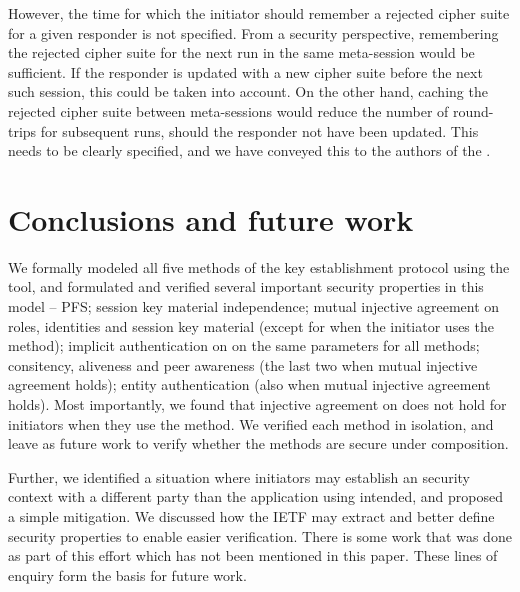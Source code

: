 \documentclass[runningheads, envcountsame, hidelinks, a4paper, x11names]{llncs}
\begin{document}
However, the time for which the initiator should
remember a rejected cipher suite for a given responder is not specified.
%
From a security perspective, remembering the rejected cipher suite for the
next \mEdhoc{} run in the same meta-session would be sufficient.
%
If the responder is updated with a new cipher suite before the next such
session, this could be taken into account. On the other hand, caching the
rejected cipher suite between meta-sessions would reduce the number of
round-trips for subsequent runs, should the responder not have been updated.
%
This needs to be clearly specified, and we have conveyed this to the authors of the \mSpec.

\section{Conclusions and future work}
\label{sec:conclusions}
We formally modeled all five
methods of the \mEdhoc{} key establishment protocol using the \mTamarin{} tool, and
formulated and verified several important security properties in this model --
PFS; session key material independence; mutual injective agreement on roles, identities and session key material
(except for when the initiator uses the \mStat{} method); implicit
authentication on on the same parameters for all methods; consitency, aliveness
and peer awareness (the last two when mutual injective agreement holds);
entity authentication (also when mutual injective agreement holds).
%
%
Most importantly, we found that injective agreement on \mGiy{} does not hold for
initiators when they use the \mStat{} method.
%
We verified each method in isolation, and leave as future work to verify whether
the methods are secure under composition.
%

Further, we identified a situation where initiators may establish an \mOscore{}
security context with a different party than the application using \mEdhoc{}
intended, and proposed a simple mitigation.
%
We discussed how the IETF may extract and better define security properties to
enable easier verification.
%
There is some work that was done as part of this effort which has not been mentioned in this paper. These lines of enquiry form the basis for future work.
\end{document}
